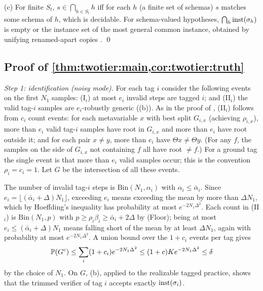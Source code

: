 (c) For finite $S_t$, $s\in\bigcap_{h\in S_t}h$ iff for each $h$ (a finite set of schemas) $s$ matches some schema of $h$, which is decidable. For schema-valued hypotheses, $\bigcap_h\mathrm{inst}(\sigma_h)$ is empty or the instance set of the most general common instance, obtained by unifying renamed-apart copies \citep{robinson1965machine}. \qed

\subsection{Proof of \texorpdfstring{\cref{thm:twotier:main,cor:twotier:truth}}{the main theorem}}\label{app:twotier:main}

\emph{Step 1: identification (noisy mode).} For each tag $i$ consider the following events on the first $N_1$ samples: (I$_i$) at most $e_i$ invalid steps are tagged $i$; and (II$_i$) the valid tag-$i$ samples are $e_i$-robustly generic ((b)). As in the proof of , (II$_i$) follows from $c_i$ count events: for each metavariable $x$ with best split $G_{i,x}$ (achieving $\rho_{i,x}$), more than $e_i$ valid tag-$i$ samples have root in $G_{i,x}$ and more than $e_i$ have root outside it; and for each pair $x\neq y$, more than $e_i$ have $\Theta x\neq\Theta y$. (For any $f$, the samples on the side of $G_{i,x}$ not containing $f$ all have root $\neq f$.) For a ground tag the single event is that more than $e_i$ valid samples occur; this is the convention $\rho_i=c_i=1$. Let $G$ be the intersection of all these events.

The number of invalid tag-$i$ steps is $\mathrm{Bin}(N_1,\alpha_i)$ with $\alpha_i\le\bar\alpha_i$. Since $e_i=\lfloor(\bar\alpha_i+\Delta)N_1\rfloor$, exceeding $e_i$ means exceeding the mean by more than $\Delta N_1$, which by Hoeffding's inequality \citep{hoeffding1963probability} has probability at most $e^{-2N_1\Delta^2}$. Each count in (II$_i$) is $\mathrm{Bin}(N_1,p)$ with $p\ge\rho_i\beta_i\ge\bar\alpha_i+2\Delta$ by (Floor); being at most $e_i\le(\bar\alpha_i+\Delta)N_1$ means falling short of the mean by at least $\Delta N_1$, again with probability at most $e^{-2N_1\Delta^2}$. A union bound over the $1+c_i$ events per tag gives
\[
\mathbb{P}(G^c)\le\sum_i(1+c_i)e^{-2N_1\Delta^2}\le(1+c)Ke^{-2N_1\Delta^2}\le\delta
\]
by the choice of $N_1$. On $G$, (b), applied to the realizable tagged practice, shows that the trimmed verifier of tag $i$ accepts exactly $\mathrm{inst}(\sigma_i)$.

